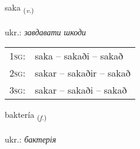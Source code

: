 \documentclass[frontgrid, backgrid]{flacards}\usepackage[]{graphicx}\usepackage[]{xcolor}
\begin{document}
\renewcommand{\flhead}{\vskip5pt \fboxsep=0pt {\small\bfseries\footnotesize Sagnorð | дієслово}}
\renewcommand{\fcfoot}{\vskip5pt \fboxsep=0pt \hspace{2pt}{\small\bfseries\footnotesize 3K}}

\renewcommand{\blhead}{\vskip5pt {\small\bfseries\footnotesize Sagnorð | дієслово }}
\renewcommand{\bcfoot}{\vskip5pt \hspace{2pt}{\small\bfseries\footnotesize 3K}}


{saka \small{\textsubscript{(\textit{v.})}} \\[1ex] %
\textphonetic{[saːka]} \\
ukr.: \emph{завдавати шкоди} \\  [2ex]
\renewcommand*{\arraystretch}{0.8}
\begin{tabular}{p{1cm}l}
\textsc{1sg}: & saka -- sakaði -- sakað \\ 
\textsc{2sg}: & sakar -- sakaðir -- sakað \\ 
\textsc{3sg}: & sakar -- sakaði -- sakað \\ 
\end{tabular}
}

\renewcommand{\flhead}{\vskip5pt \fboxsep=0pt {\small\bfseries\footnotesize Nafnorð | іменник}}
\renewcommand{\fcfoot}{\vskip5pt \fboxsep=0pt \hspace{2pt}{\small\bfseries\footnotesize 3K}}

\renewcommand{\blhead}{\vskip5pt {\small\bfseries\footnotesize Nafnorð | іменник }}
\renewcommand{\bcfoot}{\vskip5pt \hspace{2pt}{\small\bfseries\footnotesize 3K}}


{baktería \small{\textsubscript{(\textit{f.})}} \\[1ex] %
\textphonetic{[paxtɛrija]} \\
ukr.: \emph{бактерія} \\  [2ex]
\renewcommand*{\arraystretch}{0.8}
}
\end{document}
